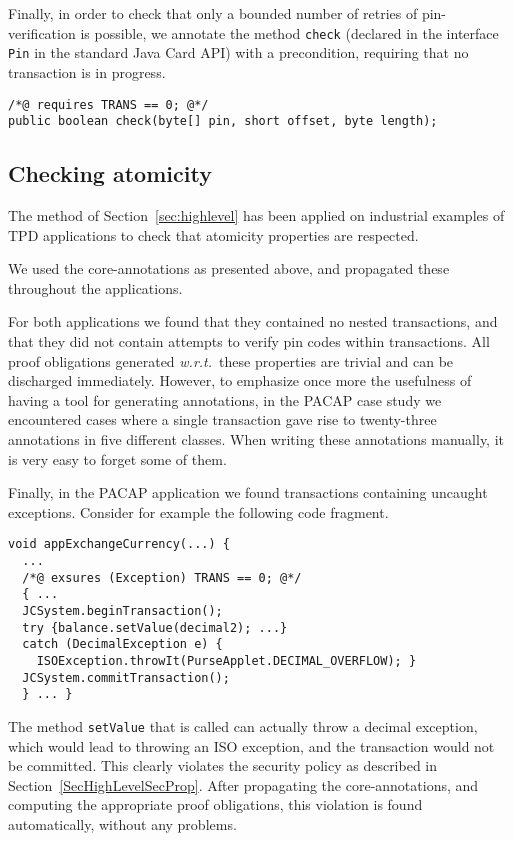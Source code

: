 Finally, in order to check that only a bounded number of retries of
pin-verification is possible, we annotate the method \texttt{check}
(declared in the interface \texttt{Pin} in the
standard Java Card API) with a precondition, requiring that no
transaction is in progress.
\begin{verbatim}
/*@ requires TRANS == 0; @*/
public boolean check(byte[] pin, short offset, byte length);
\end{verbatim}

\subsection{Checking atomicity}
The method of Section~\ref{sec:highlevel} has been applied on
industrial examples of TPD applications to check that atomicity
properties are respected.



 We used the core-annotations as presented above, and
propagated these throughout the applications.

For both applications we found that they contained no nested
transactions, and that they did not contain attempts to verify pin
codes within transactions. All proof obligations generated
\emph{w.r.t.}~these properties are trivial and can be discharged
immediately. However, to emphasize once more the usefulness of having
a tool for generating annotations, in the PACAP case study we
encountered cases where a single transaction gave rise to twenty-three
annotations in five different classes. When writing these annotations
manually, it is very easy to forget some of them.

Finally, in the PACAP application we found transactions containing
uncaught exceptions. Consider for example the following code fragment.
\begin{verbatim}
void appExchangeCurrency(...) { 
  ...
  /*@ exsures (Exception) TRANS == 0; @*/ 
  { ...
  JCSystem.beginTransaction();      
  try {balance.setValue(decimal2); ...}
  catch (DecimalException e) {
    ISOException.throwIt(PurseApplet.DECIMAL_OVERFLOW); }
  JCSystem.commitTransaction();
  } ... }
\end{verbatim}
The method \texttt{setValue} that is called can actually throw a
decimal exception, which would lead to throwing an ISO exception, and
the transaction would not be committed. This clearly violates the
security policy as described in
Section~\ref{SecHighLevelSecProp}. After propagating the
core-annotations, and computing the appropriate proof obligations,
this violation is found automatically, without any problems.

